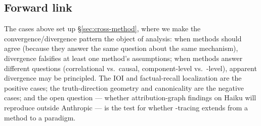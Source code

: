 \subsection{Forward link}
\label{sec:circuit-forward}

The cases above set up \S\ref{sec:cross-method}, where we make the
convergence/divergence pattern the object of analysis: when methods
should agree (because they answer the same question about the same
mechanism), divergence falsifies at least one method's assumptions;
when methods answer different questions (correlational vs.\ causal,
component-level vs.\ -level), apparent divergence may be
principled. The IOI  and factual-recall localization are the
positive cases; the truth-direction geometry and  canonicality are
the negative cases; and the open question --- whether attribution-graph
findings on Haiku will reproduce outside Anthropic --- is the
test for whether -tracing extends from a method to a paradigm.
